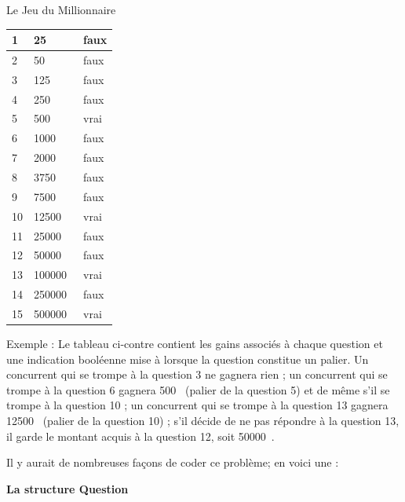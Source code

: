 \begin{Exercice}{Le Jeu du Millionnaire}
	\begin{minipage}[t][][b]{2.5cm}
	\begin{center}
	\begin{footnotesize}
	\begin{tabular}{|l|l|l|}\hline
	  1 &      25~\texteuro & faux \\\hline
	  2 &      50~\texteuro & faux \\\hline
	  3 &     125~\texteuro & faux \\\hline
	  4 &     250~\texteuro & faux \\\hline
	  5 &     500~\texteuro & vrai \\\hline
	  6 &    1000~\texteuro & faux \\\hline
	  7 &    2000~\texteuro & faux \\\hline
	  8 &    3750~\texteuro & faux \\\hline
	  9 &    7500~\texteuro & faux \\\hline
	 10 &   12500~\texteuro & vrai \\\hline
	 11 &   25000~\texteuro & faux \\\hline
	 12 &   50000~\texteuro & faux \\\hline
	 13 &  100000~\texteuro & vrai \\\hline
	 14 &  250000~\texteuro & faux \\\hline
	 15 &  500000~\texteuro & vrai \\\hline
	\end{tabular}
	\end{footnotesize}
	\end{center}
	\end{minipage}%
	\hfill
	\begin{minipage}[t][][b]{10cm}
	Exemple : Le tableau ci-contre contient les gains associés à chaque 
	question et une indication booléenne mise à
	 lorsque la question
	constitue un palier. Un concurrent qui se
	trompe à la question 3 ne gagnera rien ; un concurrent qui se trompe à
	la question 6 gagnera 500~\texteuro{} (palier de la question 5) et de même s’il
	se trompe à la question 10 ; un concurrent qui se trompe à la question
	13 gagnera 12500~\texteuro{} (palier de la question 10) ; 
	s'il décide de ne pas répondre à la question 13,
	il garde le montant acquis à la question 12, soit 50000~\texteuro.
	\end{minipage}
	
	Il y aurait de nombreuses façons de coder ce problème; en voici une :

	{\bfseries La structure Question}


\end{Exercice}
